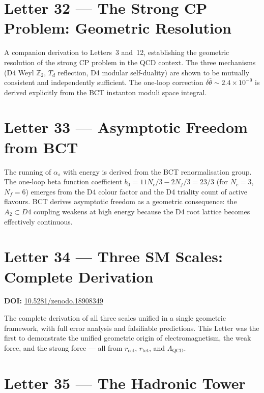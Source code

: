 \documentclass[aps,prl,twocolumn,showpacs,preprintnumbers]{revtex4-2}
\newcommand{\roct}{r_{\mathrm{oct}}}
\newcommand{\rtet}{r_{\mathrm{tet}}}
\newcommand{\LQCD}{\Lambda_{\mathrm{QCD}}}
\begin{document}
\section{Letter 32 --- The Strong CP Problem: Geometric Resolution}

\medskip
A companion derivation to Letters~3 and~12, establishing the geometric
resolution of the strong CP problem in the QCD context. The three
mechanisms (D4 Weyl $\mathbb{Z}_2$, $T_d$ reflection, D4 modular
self-duality) are shown to be mutually consistent and independently
sufficient. The one-loop correction $\delta\bar\theta \sim 2.4\times10^{-9}$
is derived explicitly from the BCT instanton moduli space integral.

\section{Letter 33 --- Asymptotic Freedom from BCT}

\medskip
The running of $\alpha_s$ with energy is derived from the BCT
renormalisation group. The one-loop beta function coefficient
$b_0 = 11N_c/3 - 2N_f/3 = 23/3$ (for $N_c=3$, $N_f=6$) emerges
from the D4 colour factor and the D4 triality count of active flavours.
BCT derives asymptotic freedom as a geometric consequence: the
$A_2 \subset D4$ coupling weakens at high energy because the D4
root lattice becomes effectively continuous.

\section{Letter 34 --- Three SM Scales: Complete Derivation}
\noindent\textbf{DOI:} \href{https://doi.org/10.5281/zenodo.18908349}{10.5281/zenodo.18908349}

\medskip
The complete derivation of all three scales unified in a single
geometric framework, with full error analysis and falsifiable predictions.
This Letter was the first to demonstrate the unified geometric origin
of electromagnetism, the weak force, and the strong force --- all
from $\roct$, $\rtet$, and $\LQCD$.

\section{Letter 35 --- The Hadronic Tower}
\end{document}
